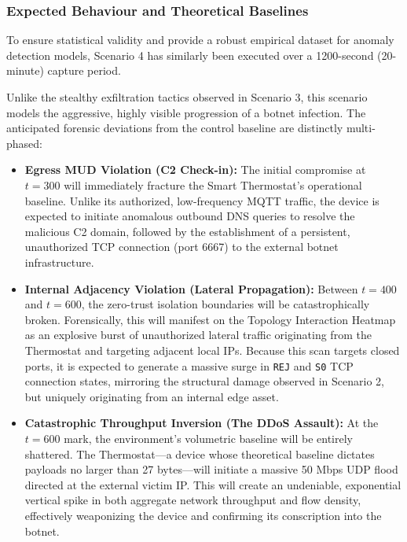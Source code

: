 \subsubsection{Expected Behaviour and Theoretical Baselines}

To ensure statistical validity and provide a robust empirical dataset for anomaly detection models, Scenario 4 has similarly been executed over a 1200-second (20-minute) capture period. 

Unlike the stealthy exfiltration tactics observed in Scenario 3, this scenario models the aggressive, highly visible progression of a botnet infection. The anticipated forensic deviations from the control baseline are distinctly multi-phased:

\begin{itemize}
	\item \textbf{Egress MUD Violation (C2 Check-in):} The initial compromise at $t=300$ will immediately fracture the Smart Thermostat's operational baseline. Unlike its authorized, low-frequency MQTT traffic, the device is expected to initiate anomalous outbound DNS queries to resolve the malicious C2 domain, followed by the establishment of a persistent, unauthorized TCP connection (port 6667) to the external botnet infrastructure.
	
	\item \textbf{Internal Adjacency Violation (Lateral Propagation):} Between $t=400$ and $t=600$, the zero-trust isolation boundaries will be catastrophically broken. Forensically, this will manifest on the Topology Interaction Heatmap as an explosive burst of unauthorized lateral traffic originating from the Thermostat and targeting adjacent local IPs. Because this scan targets closed ports, it is expected to generate a massive surge in \texttt{REJ} and \texttt{S0} TCP connection states, mirroring the structural damage observed in Scenario 2, but uniquely originating from an internal edge asset.
	
	\item \textbf{Catastrophic Throughput Inversion (The DDoS Assault):} At the $t=600$ mark, the environment's volumetric baseline will be entirely shattered. The Thermostat—a device whose theoretical baseline dictates payloads no larger than 27 bytes—will initiate a massive 50 Mbps UDP flood directed at the external victim IP. This will create an undeniable, exponential vertical spike in both aggregate network throughput and flow density, effectively weaponizing the device and confirming its conscription into the botnet.
\end{itemize}

